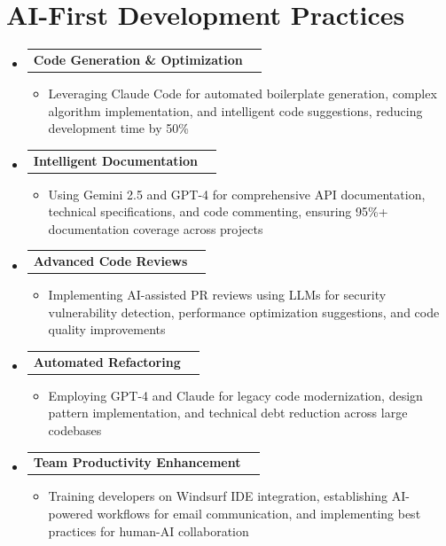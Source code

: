 \documentclass[letterpaper,11pt]{article}
\makeatletter
\newcommand{\resumeItem}[1]{
  \item\small{
    {#1 \vspace{-2pt}}
  }
}
\newcommand{\resumeProjectHeading}[2]{
    \item
    \begin{tabular*}{0.97\textwidth}{l@{\extracolsep{\fill}}r}
      \small#1 & #2 \\
    \end{tabular*}\vspace{-7pt}
}
\newcommand{\resumeSubHeadingListStart}{\begin{itemize}[leftmargin=0.15in, label={}]}
\newcommand{\resumeSubHeadingListEnd}{\end{itemize}}
\newcommand{\resumeItemListStart}{\begin{itemize}}
\newcommand{\resumeItemListEnd}{\end{itemize}\vspace{-5pt}}
\makeatother
\begin{document}
\section{AI-First Development Practices}
  \resumeSubHeadingListStart
    \resumeProjectHeading
          {\textbf{Code Generation \& Optimization}}{ }
          \resumeItemListStart
            \resumeItem{Leveraging Claude Code for automated boilerplate generation, complex algorithm implementation, and intelligent code suggestions, reducing development time by 50\%}
          \resumeItemListEnd
    \resumeProjectHeading
          {\textbf{Intelligent Documentation}}{ }
          \resumeItemListStart
            \resumeItem{Using Gemini 2.5 and GPT-4 for comprehensive API documentation, technical specifications, and code commenting, ensuring 95\%+ documentation coverage across projects}
          \resumeItemListEnd
    \resumeProjectHeading
          {\textbf{Advanced Code Reviews}}{ }
          \resumeItemListStart
            \resumeItem{Implementing AI-assisted PR reviews using LLMs for security vulnerability detection, performance optimization suggestions, and code quality improvements}
          \resumeItemListEnd
    \resumeProjectHeading
          {\textbf{Automated Refactoring}}{ }
          \resumeItemListStart
            \resumeItem{Employing GPT-4 and Claude for legacy code modernization, design pattern implementation, and technical debt reduction across large codebases}
          \resumeItemListEnd
    \resumeProjectHeading
          {\textbf{Team Productivity Enhancement}}{ }
          \resumeItemListStart
            \resumeItem{Training developers on Windsurf IDE integration, establishing AI-powered workflows for email communication, and implementing best practices for human-AI collaboration}
          \resumeItemListEnd
  \resumeSubHeadingListEnd

\end{document}
